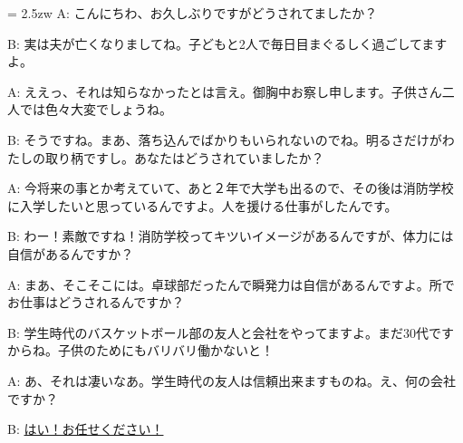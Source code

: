 \documentclass[11pt]{amsart}
\title{}
\author{}
\newenvironment{hangall}[1]{\hangindent = 2.5zw\everypar{\hangindent = 2.5zw}}{}
\begin{document}
\maketitle
\begin{hangall}{}%
A: こんにちわ、お久しぶりですがどうされてましたか？

B: 実は夫が亡くなりましてね。子どもと2人で毎日目まぐるしく過ごしてますよ。

A: ええっ、それは知らなかったとは言え。御胸中お察し申します。子供さん二人では色々大変でしょうね。

B: そうですね。まあ、落ち込んでばかりもいられないのでね。明るさだけがわたしの取り柄ですし。あなたはどうされていましたか？

A: 今将来の事とか考えていて、あと２年で大学も出るので、その後は消防学校に入学したいと思っているんですよ。人を援ける仕事がしたんです。

B: わー！素敵ですね！消防学校ってキツいイメージがあるんですが、体力には自信があるんですか？

A: まあ、そこそこには。卓球部だったんで瞬発力は自信があるんですよ。所でお仕事はどうされるんですか？

B: 学生時代のバスケットボール部の友人と会社をやってますよ。まだ30代ですからね。子供のためにもバリバリ働かないと！

A: あ、それは凄いなあ。学生時代の友人は信頼出来ますものね。え、何の会社ですか？

B: \ul{はい！お任せください！}\end{hangall}
\end{document}

